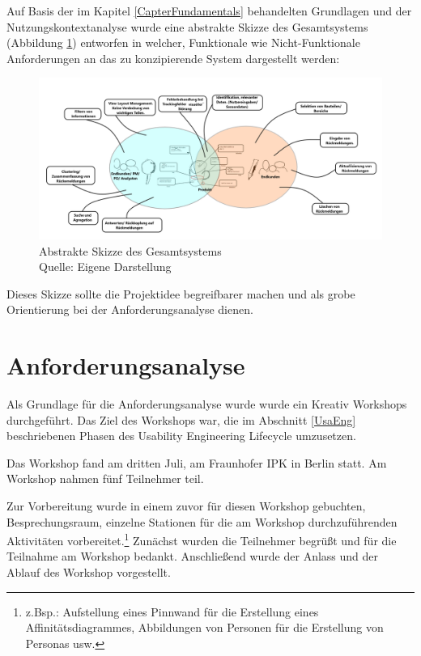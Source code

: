 Auf Basis der im Kapitel \ref{CapterFundamentals} behandelten Grundlagen und der Nutzungskontextanalyse wurde eine abstrakte Skizze des Gesamtsystems (Abbildung \ref{img:sysstem_sketch}) entworfen in welcher, 
Funktionale wie Nicht-Funktionale Anforderungen an das zu konzipierende System dargestellt werden:

\begin{figure}[H]
	\centering
	\includegraphics[width=1.0\textwidth]{resources/conception/skizze_gesamtsystem.png}
	\caption{Abstrakte Skizze des Gesamtsystems \\Quelle: Eigene Darstellung}
	\label{img:sysstem_sketch}
\end{figure}

Dieses Skizze sollte die Projektidee begreifbarer machen und als grobe Orientierung bei der Anforderungsanalyse dienen.

\section{Anforderungsanalyse}

Als Grundlage für die Anforderungsanalyse wurde wurde ein Kreativ Workshops durchgeführt. Das Ziel des Workshops war, die im Abschnitt \ref{UsaEng} beschriebenen Phasen des Usability Engineering Lifecycle 
umzusetzen.   

Das Workshop fand am dritten Juli, am Fraunhofer IPK in Berlin statt. Am Workshop nahmen fünf Teilnehmer teil. %


Zur Vorbereitung wurde in einem zuvor für diesen Workshop gebuchten, Besprechungsraum, einzelne Stationen für die am Workshop durchzuführenden Aktivitäten vorbereitet.\footnote{z.Bsp.: Aufstellung eines Pinnwand für die Erstellung eines Affinitätsdiagrammes, Abbildungen von Personen für die Erstellung von Personas usw.} 
Zunächst wurden die Teilnehmer begrüßt und für die Teilnahme am Workshop bedankt. Anschließend wurde der Anlass und der Ablauf des Workshop vorgestellt. 

